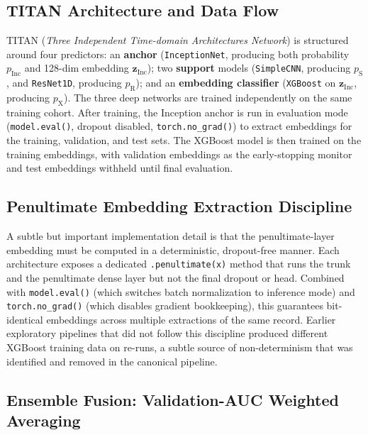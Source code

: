 \subsection{TITAN Architecture and Data Flow}

TITAN (\textit{Three Independent Time-domain Architectures Network}) is structured around four predictors: an \textbf{anchor} (\texttt{InceptionNet}, producing both probability $p_{\mathrm{Inc}}$ and 128-dim embedding $\mathbf{z}_{\mathrm{Inc}}$); two \textbf{support} models (\texttt{SimpleCNN}, producing $p_{\mathrm{S}}$, and \texttt{ResNet1D}, producing $p_{\mathrm{R}}$); and an \textbf{embedding classifier} (\texttt{XGBoost} on $\mathbf{z}_{\mathrm{Inc}}$, producing $p_{\mathrm{X}}$). The three deep networks are trained independently on the same training cohort. After training, the Inception anchor is run in evaluation mode (\texttt{model.eval()}, dropout disabled, \texttt{torch.no\_grad()}) to extract embeddings for the training, validation, and test sets. The XGBoost model is then trained on the training embeddings, with validation embeddings as the early-stopping monitor and test embeddings withheld until final evaluation.

\subsection{Penultimate Embedding Extraction Discipline}

A subtle but important implementation detail is that the penultimate-layer embedding must be computed in a deterministic, dropout-free manner. Each architecture exposes a dedicated \texttt{.penultimate(x)} method that runs the trunk and the penultimate dense layer but not the final dropout or head. Combined with \texttt{model.eval()} (which switches batch normalization to inference mode) and \texttt{torch.no\_grad()} (which disables gradient bookkeeping), this guarantees bit-identical embeddings across multiple extractions of the same record. Earlier exploratory pipelines that did not follow this discipline produced different XGBoost training data on re-runs, a subtle source of non-determinism that was identified and removed in the canonical pipeline.

\subsection{Ensemble Fusion: Validation-AUC Weighted Averaging}

